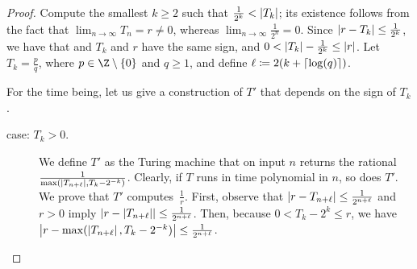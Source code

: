 \begin{proof}
  Compute the smallest $k \geq 2$ such that
  $\frac{1}{2^k} < \left|T_k\right|$; its existence follows from the fact
  that $\lim_{n \to \infty} T_n = r \neq 0$, whereas $\lim_{n \to \infty}
  \frac{1}{2^n} = 0$. Since $\left|r - T_k\right| \leq \frac{1}{2^k}$, we have 
  that and $T_k$ and $r$ have the same sign, and $0 < \left|T_k\right|-\frac{1}{2^k} \leq \left|r\right|$. 
  Let $T_k = \frac{p}{q}$, where $p \in \Z \setminus \{0\}$ and $q \geq 1$, 
  and define ${\ell \coloneqq 2(k + \left\lceil\log(q)\right\rceil)}$.

  For the time being, let us give a construction of $T'$ that depends on the sign of $T_k$.

  \begin{description}
    \item[case: $T_k > 0$.] 
      We define $T'$ as the Turing machine that on input $n$ returns the
      rational $\frac{1}{\max(\left|T_{n+\ell}\right|,T_k - 2^{-k})}$. Clearly, if $T$
      runs in time polynomial in $n$, so does $T'$. We
      prove that $T'$ computes~$\frac{1}{r}$. First, observe that
      $\left|r-T_{n+\ell}\right| \leq \frac{1}{2^{n+\ell}}$ and $r > 0$ imply
      $\left|r-\left|T_{n+\ell}\right|\right| \leq \frac{1}{2^{n+\ell}}$. Then, because $0 <
      T_k - 2^k \leq r$, we have $\left|r-\max(\left|T_{n+\ell}\right|,T_{k}-2^{-k})\right|
      \leq \frac{1}{2^{n+\ell}}$.


\end{description}
\end{proof}
